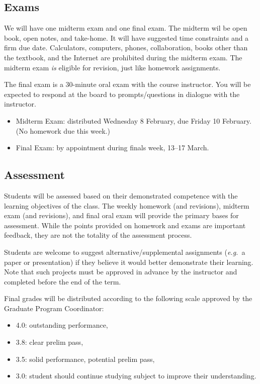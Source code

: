 \documentclass[11pt,twoside]{amsart}
\begin{document}
\subsection*{Exams}
We will have one midterm exam and one final exam. The midterm wil be open book, open notes, and take-home. It will have suggested time constraints and a firm due date. Calculators, computers, phones, collaboration, books other than the textbook, and the Internet are prohibited during the midterm exam. The midterm exam \emph{is} eligible for revision, just like homework assignments.

The final exam is a 30-minute oral exam with the course instructor. You will be expected to respond at the board to prompts/questions in dialogue with the instructor.

\begin{itemize}
\item Midterm Exam: distributed Wednesday 8 February, due Friday 10 February. (No homework due this week.)
\item Final Exam: by appointment during finals week, 13--17 March.
\end{itemize}

\subsection*{Assessment}%
Students will be assessed based on their demonstrated competence with the learning objectives of the class. The weekly homework (and revisions), midterm exam (and revisions), and final oral exam will provide the primary bases for assessment. While the points provided on homework and exams are important feedback, they are not the totality of the assessment process.

Students are welcome to suggest alternative/supplemental assignments (\emph{e.g.}~a paper or presentation) if they believe it would better demonstrate their learning. Note that such projects must be approved in advance by the instructor and completed before the end of the term.

Final grades will be distributed according to the following scale approved by the Graduate Program Coordinator:
\begin{itemize}
\item 4.0: outstanding performance,
\item 3.8: clear prelim pass,
\item 3.5: solid performance, potential prelim pass,
\item 3.0: student should continue studying subject to improve their understanding.
\end{itemize}
\end{document}
